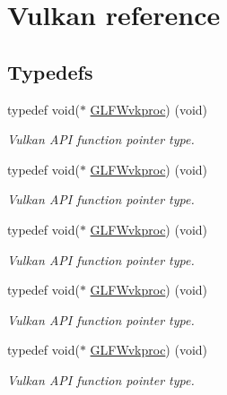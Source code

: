 \hypertarget{group__vulkan}{}\section{Vulkan reference}
\label{group__vulkan}
\subsection*{Typedefs}
\begin{DoxyCompactItemize}
\item 
typedef void($\ast$ \hyperlink{group__vulkan_ga70c01918dc9d233a4fbe0681a43018af}{G\+L\+F\+Wvkproc}) (void)
\begin{DoxyCompactList}\small\item\em Vulkan A\+PI function pointer type. \end{DoxyCompactList}\item 
typedef void($\ast$ \hyperlink{group__vulkan_ga70c01918dc9d233a4fbe0681a43018af}{G\+L\+F\+Wvkproc}) (void)
\begin{DoxyCompactList}\small\item\em Vulkan A\+PI function pointer type. \end{DoxyCompactList}\item 
typedef void($\ast$ \hyperlink{group__vulkan_ga70c01918dc9d233a4fbe0681a43018af}{G\+L\+F\+Wvkproc}) (void)
\begin{DoxyCompactList}\small\item\em Vulkan A\+PI function pointer type. \end{DoxyCompactList}\item 
typedef void($\ast$ \hyperlink{group__vulkan_ga70c01918dc9d233a4fbe0681a43018af}{G\+L\+F\+Wvkproc}) (void)
\begin{DoxyCompactList}\small\item\em Vulkan A\+PI function pointer type. \end{DoxyCompactList}\item 
typedef void($\ast$ \hyperlink{group__vulkan_ga70c01918dc9d233a4fbe0681a43018af}{G\+L\+F\+Wvkproc}) (void)
\begin{DoxyCompactList}\small\item\em Vulkan A\+PI function pointer type. \end{DoxyCompactList}\end{DoxyCompactItemize}
